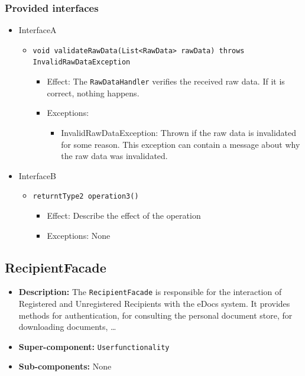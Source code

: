 \documentclass[a4paper,10pt]{article}
\begin{document}
\subsubsection*{Provided interfaces}
\begin{itemize}
    \item InterfaceA
    \begin{itemize}
        \item \texttt{void validateRawData(List<RawData> rawData) throws InvalidRawDataException}
        \begin{itemize}
            \item Effect: The \texttt{RawDataHandler} verifies the received raw data. If it is correct, nothing happens.
            \item Exceptions:
            \begin{itemize}
                \item InvalidRawDataException: Thrown if the raw data is invalidated for some reason. This exception can contain a message about why the raw data was invalidated.
            \end{itemize}
        \end{itemize}
    \end{itemize}

    \item InterfaceB
    \begin{itemize}
        \item \texttt{returntType2 operation3()}
        \begin{itemize}
            \item Effect: Describe the effect of the operation
            \item Exceptions: None
        \end{itemize}
    \end{itemize}
\end{itemize}

\subsection{RecipientFacade}
\begin{itemize}
    \item \textbf{Description:} The \texttt{RecipientFacade} is responsible for the interaction of Registered and Unregistered Recipients with the eDocs system. It provides methods for authentication, for consulting the personal document store, for downloading documents, \dots
    \item \textbf{Super-component:} \texttt{Userfunctionality}
    \item \textbf{Sub-components:} None
\end{itemize}
\end{document}
